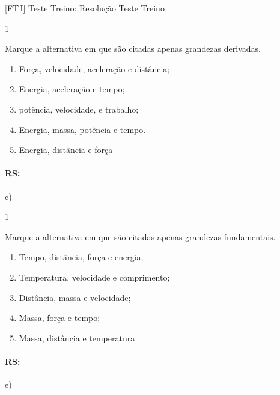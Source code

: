 \documentclass[\mainfilename]{subfiles}
\begin{document}
[FT\,I]
{Teste Treino: Resolução}
{Teste Treino}

\begin{questionBox}1{} %
    
    Marque a alternativa em que são citadas apenas grandezas derivadas.

    \begin{enumerate}[label=\alph{enumi})]
        \item Força, velocidade, aceleração e distância; 
        \item Energia, aceleração e tempo;
        \item potência, velocidade, e trabalho;
        \item Energia, massa, potência e tempo.
        \item Energia, distância e força
    \end{enumerate}

    \paragraph*{RS:} c)
    
\end{questionBox}

\begin{questionBox}1{} %
    
    Marque a alternativa em que são citadas apenas grandezas fundamentais.

    \begin{enumerate}[label=\alph{enumi})]
        \item Tempo, distância, força e energia;
        \item Temperatura, velocidade e comprimento; 
        \item Distância, massa e velocidade;
        \item Massa, força e tempo;
        \item Massa, distância e temperatura
    \end{enumerate}

    \paragraph*{RS:} e)
    
\end{questionBox}
\end{document}
